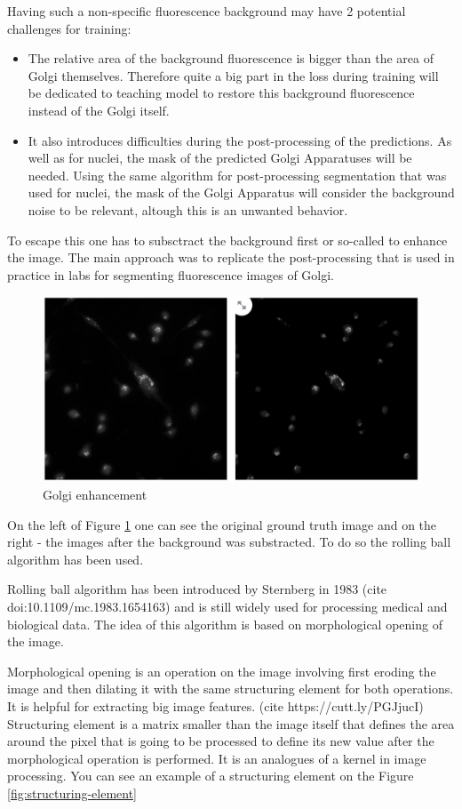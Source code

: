 Having such a non-specific fluorescence background may have 2 potential challenges for training:
\begin{itemize}
    \item The relative area of the background fluorescence is bigger than the area of Golgi themselves. Therefore quite a big part in the loss during training will be dedicated to teaching model to restore this background fluorescence instead of the Golgi itself.
    \item It also introduces difficulties during the post-processing of the predictions. As well as for nuclei, the mask of the predicted Golgi Apparatuses will be needed. Using the same algorithm for post-processing segmentation that was used for nuclei, the mask of the Golgi Apparatus will consider the background noise to be relevant, altough this is an unwanted behavior.
\end{itemize}

To escape this one has to subsctract the background first or so-called to enhance the image. The main approach was to replicate the post-processing that is used in practice in labs for segmenting fluorescence images of Golgi.

\begin{figure}[htb]
	\begin{center}
		\includegraphics[width=0.5\linewidth]{bilder/enhancement.jpg}
		\caption{Golgi enhancement}\label{fig:golgi-enhancement}
	\end{center}
\end{figure}

On the left of Figure \ref{fig:golgi-enhancement} one can see the original ground truth image and on the right - the images after the background was substracted. To do so the rolling ball algorithm has been used.

Rolling ball algorithm has been introduced by Sternberg in 1983 (cite doi:10.1109/mc.1983.1654163) and is still widely used for processing medical and biological data. The idea of this algorithm is based on morphological opening of the image. 

Morphological opening is an operation on the image involving first eroding the image and then dilating it with the same structuring element for both operations. It is helpful for extracting big image features. (cite https://cutt.ly/PGJjucI) Structuring element is a matrix smaller than the image itself that defines the area around the pixel that is going to be processed to define its new value after the morphological operation is performed. It is an analogues of a kernel in image processing. You can see an example of a structuring element on the Figure \ref{fig:structuring-element}

